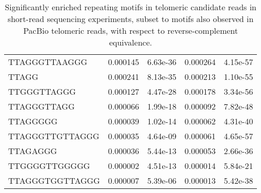 \begin{samepage}
\begin{table}[h!]
\begin{tabular}{lllll}
TTAGGGTTAAGGG   & 0.000145                  & 6.63e-36                  & 0.000264              & 4.15e-57                      \\
TTAGG           & 0.000241                  & 8.13e-35                  & 0.000213              & 1.10e-55                      \\
TTGGGTTAGGG     & 0.000127                  & 4.47e-28                  & 0.000178              & 3.34e-56                      \\
TTAGGGTTAGG     & 0.000066                  & 1.99e-18                  & 0.000092              & 7.82e-48                      \\
TTAGGGGG        & 0.000039                  & 1.02e-14                  & 0.000062              & 4.31e-40                      \\
TTAGGGTTGTTAGGG & 0.000035                  & 4.64e-09                  & 0.000061              & 4.65e-57                      \\
TTAGAGGG        & 0.000036                  & 5.44e-13                  & 0.000053              & 2.66e-36                      \\
TTGGGGTTGGGGG   & 0.000002                  & 4.51e-13                  & 0.000014              & 5.84e-21                      \\
TTAGGGTGGTTAGGG & 0.000007                  & 5.39e-06                  & 0.000013              & 5.42e-38                      \\
\hline
\end{tabular}
\caption{Significantly enriched repeating motifs in telomeric candidate reads in short-read sequencing experiments, subset to motifs also observed in PacBio telomeric reads, with respect to reverse-complement equivalence.}
\label{tab:shortread_repeatfinder}
\end{table}
\end{samepage}
